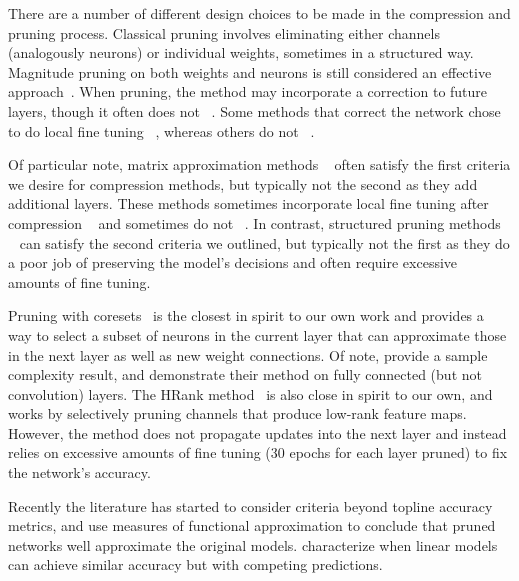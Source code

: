 There are a number of different design choices to be made in the compression and pruning process.  Classical pruning involves eliminating either channels (analogously neurons) or individual weights, sometimes in a structured way.  
Magnitude pruning on both weights and neurons is still considered an effective approach~\cite{blalock2020state,frankle2018lottery,frankle2020pruning,gale2019state,liu2019rethink,li2017l1}.  When pruning, the method may incorporate a correction to future layers, though it often does not ~\cite{he2019fpgm,luo2017thinet}. Some methods that correct the network chose to do local fine tuning ~\cite{luo2017thinet,he2017feat,zhuang2018dcp,peng2019ccp,liu2017netslim}, whereas others do not ~\cite{liebenwein2020provable,he2018amc}.  

Of particular note, matrix approximation methods
~\cite{denten2014svd,idel2020lrank,liebenwein2021alds,peng2018group,lebedev2015cpdecomp}
often satisfy the first criteria we desire for compression methods, but typically not the second as they add additional layers. These methods sometimes incorporate local fine tuning after compression ~\cite{idel2020lrank,jaderberg2014speeding,liebenwein2021alds,peng2018group,zhang20153dfilter} and sometimes do not ~\cite{denten2014svd,lebedev2015cpdecomp}.
In contrast, structured pruning methods
~\cite{he2019fpgm,he2018amc,liebenwein2020provable,liu2017netslim,liu2019rethink,luo2017thinet}
can satisfy the second criteria we outlined, but typically not the first as they do a poor job of preserving the model's decisions and often require excessive amounts of fine tuning.


Pruning with coresets~\cite{mussay2020coreset} is the closest in spirit to our own work and provides a way to select a subset of neurons in the current layer that can approximate those in the next layer as well as new weight connections. Of note, \citet{mussay2020coreset} provide a sample complexity result,
and demonstrate their method on fully connected (but not convolution) layers.
The HRank method~\cite{lin2020hrank} is also close in spirit to our own, and works by selectively pruning channels that produce low-rank feature maps.   However, the method does not propagate updates into the next layer and instead relies on excessive amounts of fine tuning (30 epochs for each layer pruned) to fix the network's accuracy.  


Recently the literature has started to consider criteria beyond topline accuracy metrics, and \citet{liebenwein2021lost} use measures of functional approximation to conclude that pruned networks well approximate the original models. 
\citet{marx2020multiplicity} characterize when linear models can achieve similar accuracy but with competing predictions.

